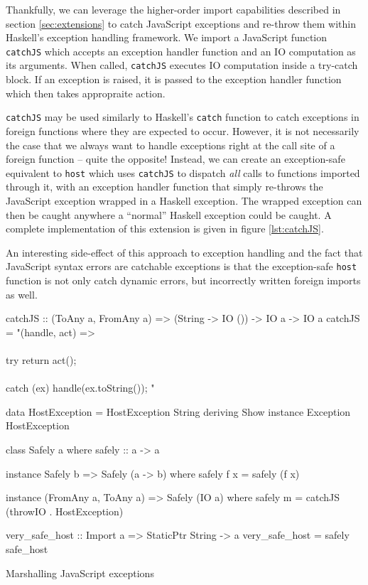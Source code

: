 \documentclass{sigplanconf}
\begin{document}
Thankfully, we can leverage the higher-order import capabilities described
in section \ref{sec:extensions} to catch JavaScript exceptions and re-throw
them within Haskell's exception handling framework.
We import a JavaScript function \lstinline!catchJS! which accepts an
exception handler function and an IO computation as its arguments.
When called, \lstinline!catchJS! executes IO computation inside a try-catch
block. If an exception is raised, it is passed to the exception handler
function which then takes appropraite action.

\lstinline!catchJS! may be used similarly to Haskell's \lstinline!catch!
function to catch exceptions in foreign functions where they are expected to
occur.
However, it is not necessarily the case that we always want to handle
exceptions right at the call site of a foreign function -- quite the opposite!
Instead, we can create an exception-safe equivalent to \lstinline!host! which
uses \lstinline!catchJS! to dispatch \emph{all} calls to functions imported
through it, with an exception handler function that simply re-throws the
JavaScript exception wrapped in a Haskell exception. The wrapped exception
can then be caught anywhere a ``normal'' Haskell exception could be caught.
A complete implementation of this extension is given in
figure \ref{lst:catchJS}.

An interesting side-effect of this approach to exception handling and the fact
that JavaScript syntax errors are catchable exceptions is that the
exception-safe \lstinline!host! function is not only catch dynamic errors,
but incorrectly written foreign imports as well.

\begin{listingfloat}
\begin{code}
catchJS :: (ToAny a, FromAny a)
        => (String -> IO ())
        -> IO a -> IO a
catchJS = "(handle, act) =>\\
  \\{ try        { return act(); }\\
  \\  catch (ex) { handle(ex.toString()); }}"

data HostException = HostException String
  deriving Show
instance Exception HostException
  
class Safely a where
  safely :: a -> a

instance Safely b => Safely (a -> b) where
  safely f x = safely (f x)

instance (FromAny a, ToAny a) => Safely (IO a) where
  safely m = catchJS (throwIO . HostException)

very_safe_host :: Import a => StaticPtr String -> a
very_safe_host = safely safe_host
\end{code}
\caption{Marshalling JavaScript exceptions}
\label{lst:catchJS}
\end{listingfloat}
\end{document}
